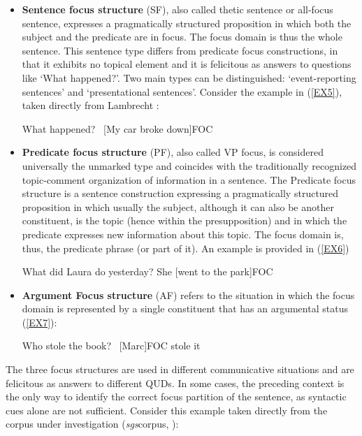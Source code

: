 \documentclass[12pt]{report}
\begin{document}
\begin{itemize}
    
    \item \textbf{Sentence focus structure} (SF), also called thetic sentence \cite{sasse1987thetic} or all-focus sentence, expresses a pragmatically structured proposition in which both the subject and the predicate are in focus. The focus domain is thus the whole sentence. This sentence type differs from predicate focus constructions, in that it exhibits no topical element and it is felicitous as answers to questions like ‘What happened?'. Two main types can be distinguished: ‘event-reporting sentences' and ‘presentational sentences'. Consider the example in (\ref{EX5}), taken directly from Lambrecht \cite{lambrecht1996information}:
    
\pex \label{EX5}
\a What happened?
\a \ [My car broke down]\tiny{FOC}
\xe

\item \textbf{Predicate focus structure} (PF), also called VP focus, is considered universally the unmarked type and coincides with the traditionally recognized topic-comment organization of information in a sentence. The Predicate focus structure is a sentence construction expressing a pragmatically structured proposition in which usually the subject, although it can also be another constituent, is the topic (hence within the presupposition) and in which the predicate expresses new information about this topic. The focus domain is, thus, the predicate phrase (or part of it). An example is provided in (\ref{EX6})
    
    \pex \label{EX6}
    \a What did Laura do yesterday?
    \a She [went to the park]\tiny{FOC}
    \xe

\item \textbf{Argument Focus structure} (AF) refers to the situation in which the focus domain is represented by a single constituent that has an argumental status (\ref{EX7}):

\pex \label{EX7}
\a Who stole the book?
\vspace{-0.4cm}
\a \ [Marc]\tiny{FOC} \normalsize stole it
\xe

\end{itemize}

\noindent
The three focus structures are used in different communicative situations and are felicitous as answers to different QUDs. In some cases, the preceding context is the only way to identify the correct focus partition of the sentence, as syntactic cues alone are not sufficient. Consider this example taken directly from the corpus under investigation (\textit{sgs}corpus, \cite{adli2011relation}):
\end{document}
